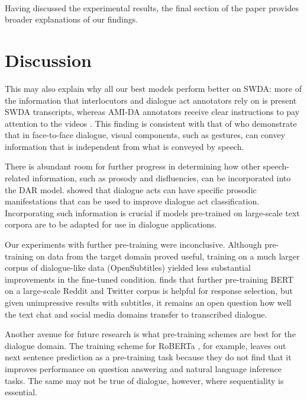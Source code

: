 \documentclass[11pt,a4paper]{article}
\begin{document}
\paragraph{}
Having discussed the experimental results, the final section of the paper provides broader explanations of our findings.


\section{Discussion} %

This may also explain why all our best models perform better on SWDA: more of the information that interlocutors and dialogue act annotators rely on is present SWDA transcripts, whereas AMI-DA annotators receive clear instructions to pay attention to the videos \citep{GuidelinesDialogueAct2005}.
This finding is consistent with that of \citet{bavelas2008gesturing} who demonstrate that in face-to-face dialogue, visual components, such as gestures, can convey information that is independent from what is conveyed by speech.

There is abundant room for further progress in determining how other speech-related information, such as prosody and disfluencies, can be incorporated into the DAR model.
\citet{stolckeDialogueActModeling2000} showed that dialogue acts can have specific prosodic manifestations that can be used to improve dialogue act classification.
Incorporating such information is crucial if models pre-trained on large-scale text corpora are to be adapted for use in dialogue applications.

Our experiments with further pre-training were inconclusive. 
Although pre-training on data from the target domain proved useful, training on a much larger corpus of dialogue-like data (OpenSubtitles) yielded less substantial improvements in the fine-tuned condition.
\citet{baoPLATOPretrainedDialogue2019} finds that further pre-training BERT on a large-scale Reddit and Twitter corpus is helpful for response selection, but given unimpressive results with subtitles, it remains an open question how well the text chat and social media domains transfer to transcribed dialogue.

Another avenue for future research is what pre-training schemes are best for the dialogue domain.
The training scheme for RoBERTa \citep{liuRoBERTaRobustlyOptimized2019}, for example, leaves out next sentence prediction as a pre-training task because they do not find that it improves performance on question answering and natural language inference tasks.
The same may not be true of dialogue, however, where sequentiality is essential.




\end{document}
